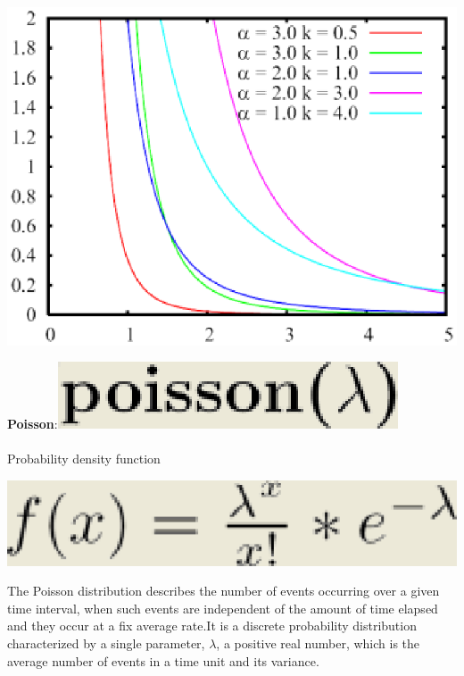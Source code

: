 \begin{center}
\includegraphics[scale=.5]{img/jsim/par_pdf.eps}
\end{center}
\textbf{Poisson}:\includegraphics[scale=.5]{img/jsim/poisson_f.eps}\\\\
Probability density function\\
\begin{center}
\includegraphics[scale=.5]{img/jsim/posson1.eps}
\end{center}
The Poisson distribution describes the number of events occurring over a given time interval, when such events are independent of  the amount of time elapsed and they occur at a fix average rate.It is a discrete probability distribution characterized by a single parameter, $\lambda$, a positive real number, which is the average number of  events in a time unit and its variance.
